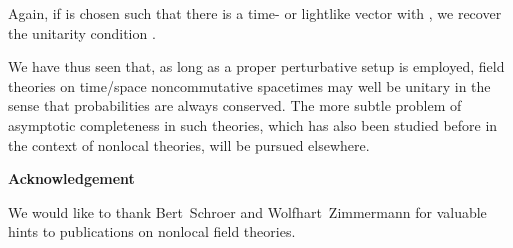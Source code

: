 \documentclass[a4paper,twoside,12pt]{article}
\begin{document}
Again, if \myHighlight{$\sigma$}\coordHE{} is chosen such that there is a  time- or lightlike vector
\coordHE{} with \coordHE{}, we recover the unitarity condition
\coordHE{}.


We have thus seen that, as long as a proper perturbative setup is
employed, field theories on time/space noncommutative spacetimes may well be
unitary in the sense that probabilities are always conserved. The more subtle
problem of asymptotic completeness in such theories, which has also been
studied before in the context of nonlocal theories, will be pursued elsewhere.

\vspace{4ex}\noindent
{\bf Acknowledgement}

\noindent 
We would like to thank Bert~Schroer and Wolfhart~Zimmermann for valuable hints
to publications on nonlocal field theories.
\end{document}
